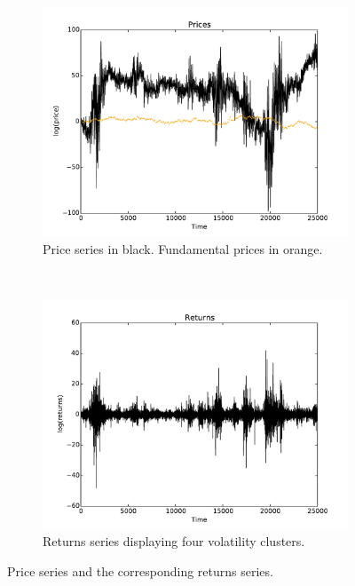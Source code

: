 \documentclass{article}
\begin{document}
\begin{figure}[h]
  \centering
  \begin{subfigure}[b]{0.48\textwidth}
    \includegraphics[width=\textwidth]{images/seriesA_prices.pdf}
    \caption{Price series in black. Fundamental prices in orange.}
  \end{subfigure}
  ~
  \begin{subfigure}[b]{0.48\textwidth}
    \includegraphics[width=\textwidth]{images/seriesA_returns.pdf}
    \caption{Returns series displaying four volatility clusters.}
  \end{subfigure}
  \caption{Price series and the corresponding returns series.}
  \label{fig:seriesA}
\end{figure}
\end{document}
